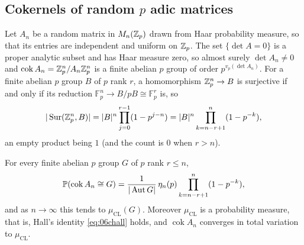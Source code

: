 \subsection{Cokernels of random $p$ adic matrices}

Let $A_n$ be a random matrix in $M_n(\mathbb{Z}_p)$ drawn from Haar probability measure, so that its entries are independent and uniform on $\mathbb{Z}_p$. The set $\{\det A = 0\}$ is a proper analytic subset and has Haar measure zero, so almost surely $\det A_n\ne0$ and $\operatorname{cok}A_n = \mathbb{Z}_p^n/A_n\mathbb{Z}_p^n$ is a finite abelian $p$ group of order $p^{v_p(\det A_n)}$. For a finite abelian $p$ group $B$ of $p$ rank $r$, a homomorphism $\mathbb{Z}_p^n\to B$ is surjective if and only if its reduction $\mathbb{F}_p^n\to B/pB\cong\mathbb{F}_p^r$ is, so
\begin{equation}\label{eq:06csur}
|\operatorname{Sur}(\mathbb{Z}_p^n,B)| = |B|^n\prod_{j=0}^{r-1}(1-p^{j-n}) = |B|^n\prod_{k=n-r+1}^{n}(1-p^{-k}),
\end{equation}
an empty product being $1$ (and the count is $0$ when $r>n$).

\begin{theorem}\label{thm:06cfw}
For every finite abelian $p$ group $G$ of $p$ rank $r\le n$,
\[
\mathbb{P}(\operatorname{cok}A_n\cong G) = \frac{1}{|\operatorname{Aut}G|}\,\eta_n(p)\prod_{k=n-r+1}^n(1-p^{-k}),
\]
and as $n\to\infty$ this tends to $\mu_{\mathrm{CL}}(G)$. Moreover $\mu_{\mathrm{CL}}$ is a probability measure, that is, Hall's identity \eqref{eq:06chall} holds, and $\operatorname{cok}A_n$ converges in total variation to $\mu_{\mathrm{CL}}$.
\end{theorem}

